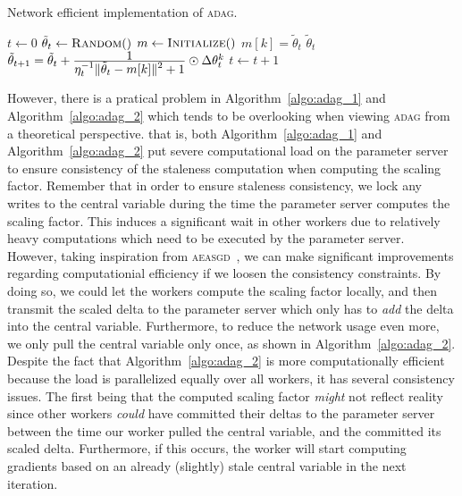 \begin{algorithm}[H]
  \caption{Network efficient implementation of \textsc{adag}.}
  \label{algo:adag_2}
  \begin{algorithmic}[1]
    \State $t \gets 0$ 
    \State $\tilde{\theta}_t \gets \Call{Random}$
    \State $m \gets \Call{Initialize}$ 
    \State
     
    \State $m[k] = \tilde{\theta}_t$
    \State \Return $\tilde{\theta}_{t}$
    \EndProcedure
    \State
    \State $\tilde{\theta}_{t + 1} = \tilde{\theta}_t + \frac{\displaystyle 1}{\displaystyle \eta_t^{-1}\|\tilde{\theta}_t - m[k]\|^2 + 1} \odot \Delta\theta^k_t$
    \State $t \gets t + 1$
    \EndProcedure
    \State
    \EndProcedure
  \end{algorithmic}
\end{algorithm}

However, there is a pratical problem in Algorithm~\ref{algo:adag_1} and Algorithm~\ref{algo:adag_2} which tends to be overlooking when viewing \textsc{adag} from a theoretical perspective. that is, both Algorithm~\ref{algo:adag_1} and Algorithm~\ref{algo:adag_2} put severe computational load on the parameter server to ensure consistency of the staleness computation when computing the scaling factor. Remember that in order to ensure staleness consistency, we lock any writes to the central variable during the time the parameter server computes the scaling factor. This induces a significant wait in other workers due to relatively heavy computations which need to be executed by the parameter server. However, taking inspiration from \textsc{aeasgd}~\cite{zhang2015deep}, we can make significant improvements regarding computationial efficiency if we loosen the consistency constraints. By doing so, we could let the workers compute the scaling factor locally, and then transmit the scaled delta to the parameter server which only has to \emph{add} the delta into the central variable. Furthermore, to reduce the network usage even more, we only pull the central variable only once, as shown in Algorithm~\ref{algo:adag_2}. Despite the fact that Algorithm~\ref{algo:adag_2} is more computationally efficient because the load is parallelized equally over all workers, it has several consistency issues. The first being that the computed scaling factor \emph{might} not reflect reality since other workers \emph{could} have committed their deltas to the parameter server between the time our worker pulled the central variable, and the committed its scaled delta. Furthermore, if this occurs, the worker will start computing gradients based on an already (slightly) stale central variable in the next iteration.

